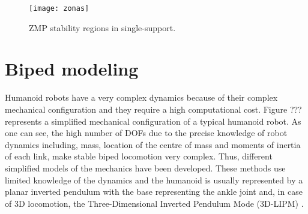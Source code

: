 \begin{figure}[!hbt]
\centering
\texttt{[image: zonas]}
\caption{ZMP stability regions in single-support.}
\label{fig:zonas}
\end{figure}



\section{Biped modeling}
Humanoid robots have a very complex dynamics because of their complex mechanical configuration and they require a high computational cost. Figure ??? represents a simplified mechanical configuration of a typical humanoid robot. As one can see, the high number of DOFs due to the precise knowledge of robot dynamics including, mass, location of the centre of mass and moments of inertia of each link, make stable biped locomotion very complex. Thus, different simplified models of the mechanics have been developed. These methods use limited knowledge of the dynamics and the humanoid is usually represented by a planar inverted pendulum with the base representing the ankle joint and, in case of 3D locomotion, the Three-Dimensional Inverted Pendulum Mode (3D-LIPM) \cite{Kaj2001}.
